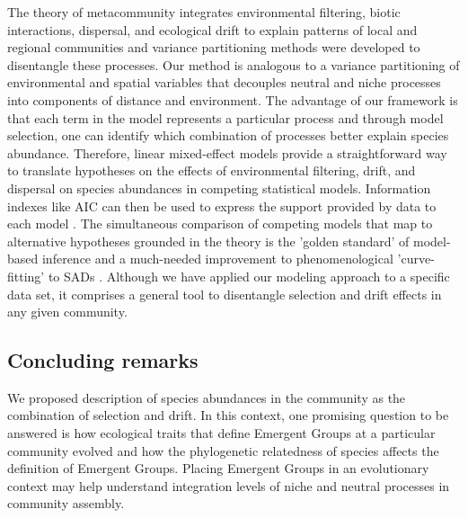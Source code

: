 \documentclass[12pt]{article}
\begin{document}
The theory of metacommunity integrates environmental filtering, biotic interactions, dispersal, and ecological drift to explain patterns of local and regional communities \citep{leibold2017metacommunity, o2019metacommunity} and variance partitioning methods were developed to disentangle these processes. 
 Our method is analogous to a variance partitioning of environmental and spatial variables \citep{Gilbert2004a} that decouples neutral and niche processes into components of distance and environment. The advantage of our framework is that each term in the model represents a particular process and through model selection, one can identify which combination of processes better explain species abundance. Therefore, linear mixed-effect models provide a straightforward way to translate hypotheses on the effects of environmental filtering, drift, and dispersal on species abundances in competing statistical models. Information indexes like AIC can then be used to express the support provided by data to each model \citep{Burham2002, Johnson2004}. The simultaneous comparison of competing models that map to alternative hypotheses grounded in the theory is the 'golden standard' of model-based inference \citep{Hilborn1997} and a much-needed improvement to phenomenological 'curve-fitting' to SADs \citep{Mcgill2003}. Although we have applied our modeling approach to a specific data set, it comprises a general tool to disentangle selection and drift effects in any given community. 


 \subsection*{Concluding remarks}
We proposed %
description of species abundances in the community as the combination of selection and drift.
In this context, one promising question to be answered is how ecological traits that define Emergent Groups at a particular community
evolved and how the phylogenetic relatedness of species affects the definition of Emergent Groups. Placing Emergent Groups in an evolutionary context may help understand integration levels of niche
and neutral processes in community assembly. %
\end{document}
